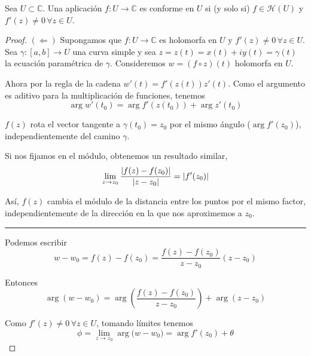 \begin{prop}
    Sea $U \subset \mathbb{C}$. Una aplicación $f: U \rightarrow \mathbb{C}$ es conforme en $U$ si (y solo si) $f \in \mathcal{H}(U)$ y $f'(z) \not = 0 \, \forall z \in U$.
\end{prop}

\begin{proof}
    $(\Leftarrow)$ Supongamos que $f: U \rightarrow \mathbb{C}$ es holomorfa en $U$ y $f'(z) \not = 0 \, \forall z \in U$. Sea $\gamma: [a,b] \rightarrow U$ una curva simple y sea $z = z(t) = x(t) + iy(t) = \gamma (t)$ la ecuación paramétrica de $\gamma$. Consideremos $w = (f \circ  z)(t)$ holomorfa en $U$.

    Ahora por la regla de la cadena $w'(t) = f'(z(t))z'(t)$. Como el argumento es aditivo para la multiplicación de funciones, tenemos
    \begin{equation*}
        \arg{w'(t_0)} = \arg{f'(z(t_0))} + \arg{z'(t_0)}
    \end{equation*}

    $f(z)$ rota el vector tangente a $\gamma(t_0) = z_0$ por el mismo ángulo ($\arg{f'(z_0)}$), independientemente del camino $\gamma$.

    Si nos fijamos en el módulo, obtenemos un resultado similar,
    \begin{equation*}
        \lim_{z \rightarrow z_0} \dfrac{\left\lvert f(z) - f(z_0)\right\rvert}{\left\lvert z - z_0\right\rvert} = \left\lvert f'(z_0)\right\rvert
    \end{equation*}

    Así, $f(z)$ cambia el módulo de la distancia entre los puntos por el mismo factor, independientemente de la dirección en la que nos aproximemos a $z_0$. \\

    \noindent\rule{8cm}{0.4pt}

    Podemos escribir
    \begin{equation*}
        w - w_0 = f(z) - f(z_0) = \dfrac{f(z)-f(z_0)}{z - z_0} (z - z_0)
    \end{equation*}

    Entonces
    \begin{equation*}
        \arg{(w - w_0)} =  \arg{ \left( \dfrac{f(z)-f(z_0)}{z - z_0} \right)} + \arg{(z - z_0)}
    \end{equation*}

    Como $f'(z) \not = 0 \, \forall z \in U$, tomando límites tenemos
    \begin{equation*}
        \phi = \lim_{z \rightarrow z_0} \arg({w-w_0)}= \arg{f'(z_0)} + \theta
    \end{equation*}


\end{proof}
